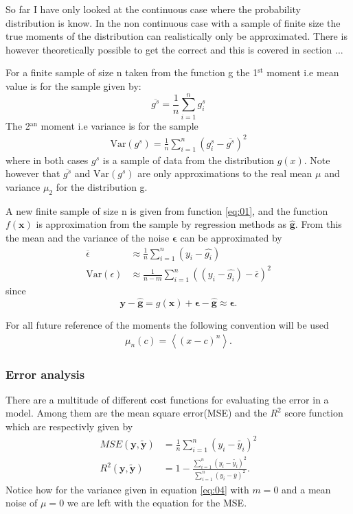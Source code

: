 \documentclass[uio,jmp,amsmath,amssymb,reprint,nofootinbib]{revtex4-1}
\numberwithin{equation}{section}
\begin{document}
So far I have only looked at the continuous case where the probability distribution is know. In the non continuous case with a sample of finite size the true moments of the distribution can realistically only be approximated. There is however theoretically possible to get the correct and this is covered in section ...

For a finite sample of size n taken from the function g the 1\(^\text{st}\) moment i.e mean value is for the sample given by:
\begin{equation}\label{eq:02}
    \overline{g^s} = \frac{1}{n}\sum_{i=1}^n g_i^s
\end{equation}
The 2\(^\text{an}\) moment i.e variance is for the sample
\begin{align}\label{eq:03}
    \text{Var}(g^s) = \frac{1}{n}\sum_{i=1}^n (g^s_i - \overline{g^s})^2
\end{align}
where in both cases \(g^s\) is a sample of data from the distribution \(g(x)\). Note however that \(\overline{g^s}\) and \(\text{Var}(g^s)\) are only approximations to the real mean \(\mu\) and variance \(\mu_2\) for the distribution g.

A new finite sample of size n is given from function \ref{eq:01}, and the function \(f(\bm{x})\) is approximation from the sample by regression methods as \(\bm{\hat{g}}\). From this the mean and the variance of the noise \(\bm{\epsilon}\) can be approximated by
\begin{align}
    \overline{\epsilon} &\approx \frac{1}{n}\sum_{i=1}^n(y_i - \hat{g_i})\\ \label{eq:04}
    \text{Var}(\epsilon) &\approx \frac{1}{n - m}\sum_{i=1}^n ((y_i - \hat{g_i}) - \overline{\epsilon})^2
\end{align}
since
\begin{equation}
    \bm{y} - \bm{\hat{g}} = g(\bm{x}) + \bm{\epsilon} - \bm{\hat{g}}\approx \bm{\epsilon}.
\end{equation}

For all future reference of the moments the following convention will be used
\begin{align}
    \mu_n(c) = \left<(x-c)^n\right>.
\end{align}

\subsubsection{Error analysis}

There are a multitude of different cost functions for evaluating the error in a model. Among them are the mean square error(MSE) and the \(R^2\) score function which are respectivly given by
\begin{align}\label{eq:05}
    MSE(\bm{y}, \bm{\tilde{y}}) &= \frac{1}{n}\sum_{i=1}^n(y_i - \tilde{y_i})^2\\ \label{eq:11}
    R^2(\bm{y}, \bm{\tilde{y}}) &= 1 - \frac{\sum_{i=1}^n(y_i - \tilde{y_i})^2}{\sum_{i=1}^n(y_i - \overline{y})^2}. 
\end{align}
Notice how for the variance given in equation \ref{eq:04} with \(m=0\) and a mean noise of \(\mu=0\) we are left with the equation for the MSE.
\end{document}
